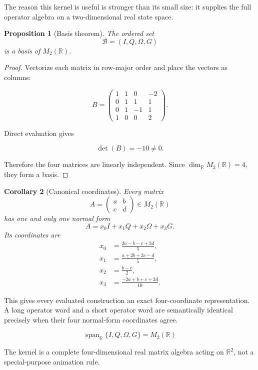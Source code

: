 \documentclass[11pt,letterpaper]{article}
\theoremstyle{clearonyx}
\newtheorem{proposition}{Proposition}[section]
\newtheorem{corollary}[proposition]{Corollary}
\newcommand{\R}{\mathbb{R}}
\newcommand{\Span}{\operatorname{span}}
\begin{document}
The reason this kernel is useful is stronger than its small size: it supplies the full operator algebra on a two-dimensional real state space.

\begin{proposition}[Basis theorem]
The ordered set
\[
\mathcal B=(I,Q,\Omega,G)
\]
is a basis of $M_2(\R)$.
\end{proposition}

\begin{proof}
Vectorize each matrix in row-major order and place the vectors as columns:

\begin{equation}
B=
\begin{pmatrix}
1&1&0&-2\\
0&1&1&1\\
0&1&-1&1\\
1&0&0&2
\end{pmatrix}.
\end{equation}

Direct evaluation gives

\begin{equation}
\det(B)=-10\neq0.
\end{equation}

Therefore the four matrices are linearly independent.  Since $\dim_{\R}M_2(\R)=4$, they form a basis.
\end{proof}

\begin{corollary}[Canonical coordinates]
Every matrix
\[
A=\begin{pmatrix}a&b\\c&d\end{pmatrix}\in M_2(\R)
\]
has one and only one normal form
\[
A=x_0I+x_1Q+x_2\Omega+x_3G.
\]
Its coordinates are
\begin{align}
 x_0&=\frac{2a-b-c+3d}{5},\\
 x_1&=\frac{a+2b+2c-d}{5},\\
 x_2&=\frac{b-c}{2},\\
 x_3&=\frac{-2a+b+c+2d}{10}.
\end{align}
\end{corollary}

This gives every evaluated construction an exact four-coordinate representation.  A long operator word and a short operator word are semantically identical precisely when their four normal-form coordinates agree.

\begin{resultbox}
\begin{equation*}
\boxed{\Span_{\R}\{I,Q,\Omega,G\}=M_2(\R)}
\end{equation*}

The kernel is a complete four-dimensional real matrix algebra acting on $\R^2$, not a special-purpose animation rule.
\end{resultbox}
\end{document}
